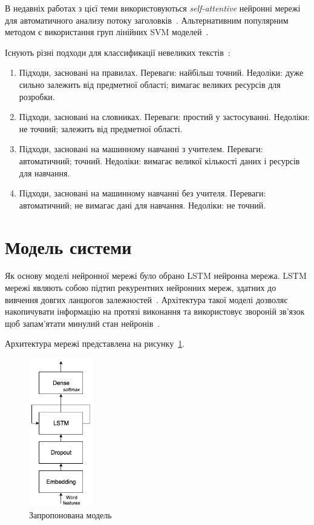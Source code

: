 В недавніх работах з цієї теми використовуються \textit{self-attentive} нейронні мережі для автоматичного анализу потоку заголовків~\cite{Chopra2017}. 
Альтернативним популярним методом є використання груп лінійних SVM моделей~\cite{Joulin2016}.

Існують різні подходи для классификації невеликих текстів~\cite{Joulin2016}:
\begin{enumerate}
    \item Підходи, засновані на правилах. Переваги: ​​найбільш точний. Недоліки: дуже сильно залежить від предметної області; вимагає великих ресурсів для розробки.
    \item Підходи, засновані на словниках. Переваги: ​​простий у застосуванні. Недоліки: не точний; залежить від предметної області.
    \item Підходи, засновані на машинному навчанні з учителем. Переваги: ​​автоматичний; точний. Недоліки: вимагає великої кількості даних і ресурсів для навчання.
    \item Підходи, засновані на машинному навчанні без учителя. Переваги: ​​автоматичний; не вимагає дані для навчання. Недоліки: не точний.
\end{enumerate}

\section{Модель системи}
Як основу моделі нейронної мережі було обрано LSTM нейронна мережа. 
LSTM мережі являють собою підтип рекурентних нейронних мереж, здатних до вивчення довгих ланцюгов залежностей~\cite{Hochreiter1997}. 
Архітектура такої моделі дозволяє накопичувати інформацію на протязі виконання та використовує звороній зв'язок щоб запам'ятати минулий стан нейронів~\cite{Christopher2015}.

Архитектура мережі представлена на рисунку~\ref{fig:approach_model}.

\begin{figure}[H]
    \centering
    \includegraphics[width=0.25\textwidth]{approach_model}
    \caption{Запропонована модель}
    \label{fig:approach_model}
\end{figure}

